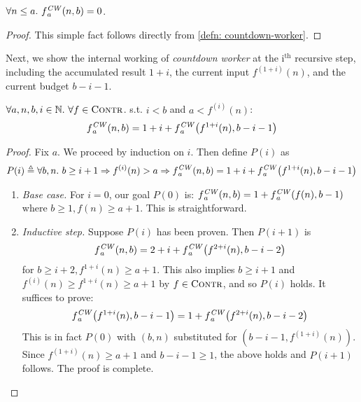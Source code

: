 \begin{lem} \label{lem: cdt-init}
	$\forall n\le a.~\cdw{f}{a} (n, b) = 0$.
\end{lem}
\begin{proof}
This simple fact follows directly from \cref{defn: countdown-worker}.
\end{proof}
Next, we show the internal working of \emph{countdown worker} at the $\text{i}^\text{th}$ recursive step, including the accumulated result $1+i$, the current input $f^{(1+i)}(n)$, and the current budget $b-i-1$.
\begin{lem} \label{lem: cdt-intermediate}
	$\forall a, n, b, i \in \mathbb{N}.~\forall f \in \text{\scshape{Contr}}$. s.t. $i < b$ and $a < f^{(i)}(n)$:~
	\begin{equation}  \label{eq: cdt-intermediate}
	\cdw{f}{a}(n, b) = 1 + i + \cdw{f}{a}\left(f^{1+i}(n), b - i - 1\right)
	\end{equation}
\end{lem}
\begin{proof}
	Fix $a$. We proceed by induction on $i$. Then define $P(i)$ as
	\begin{equation*}
	P(i) \triangleq \forall b, n.~ b\ge i+1 \Rightarrow f^{(i)}(n) > a \Rightarrow \cdw{f}{a}(n, b) = 1 + i + \cdw{f}{a}\left(f^{1+i}(n), b - i - 1\right)
	\end{equation*}
	\begin{enumerate}[leftmargin=*]
		\item \textit{Base case.} For $i = 0$, our goal $P(0)$ is:
		$\cdw{f}{a}(n, b) = 1 + \cdw{f}{a}\left(f(n), b - 1\right)$
		where $b \ge 1, f(n)\ge a+1$. This is straightforward.
		\item \textit{Inductive step.} Suppose $P(i)$ has been proven. Then $P(i+1)$ is
		\begin{equation*}
		\cdw{f}{a}(n, b) = 2 + i + \cdw{f}{a}\left( f^{2+i}(n), b - i - 2 \right)
		\end{equation*}
		for $b \ge i+2, f^{1+i}(n) \ge a+1$. This also implies $b\ge i+1$ and $\displaystyle f^{(i)}(n) \ge f^{1+i}(n)\ge a+1$ by $f\in \text{\scshape{Contr}}$, and so $P(i)$ holds. It suffices to prove:
		\begin{equation*}
		\cdw{f}{a}\left(f^{1+i}(n), b-i-1\right) = 1 + \cdw{f}{a}\left( f^{2+i}(n), b-i-2 \right)
		\end{equation*}
		This is in fact $P(0)$ with $(b, n)$ substituted for $\left(b-i-1, f^{(1+i)}(n)\right)$. Since $f^{(1+i)}(n) \ge a+1$ and $b-i-1\ge 1$, the above holds and $P(i+1)$ follows. The proof is complete. \vspace*{-2.2em}
	\end{enumerate}
\end{proof}
